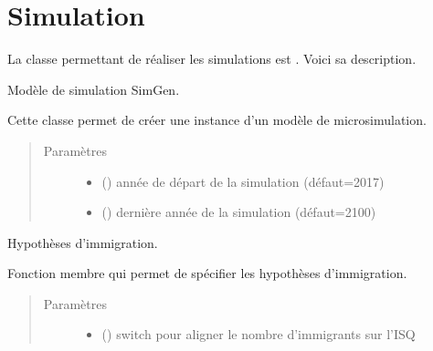 \documentclass[letterpaper,10pt,french]{sphinxmanual}
\begin{document}
\section{Simulation}
\label{\detokenize{code:simulation}}
La classe permettant de réaliser les simulations est . Voici sa description.

\begin{fulllineitems}
\label{\detokenize{code:simgen.model}}
Modèle de simulation SimGen.

Cette classe permet de créer une instance d’un modèle de microsimulation.
\begin{quote}\begin{description}
\item[{Paramètres}] \leavevmode\begin{itemize}
\item {} 
 () \textendash{} année de départ de la simulation (défaut=2017)

\item {} 
 () \textendash{} dernière année de la simulation (défaut=2100)

\end{itemize}

\end{description}\end{quote}

\begin{fulllineitems}
\label{\detokenize{code:simgen.model.immig_assumptions}}
Hypothèses d’immigration.

Fonction membre qui permet de spécifier les hypothèses d’immigration.
\begin{quote}\begin{description}
\item[{Paramètres}] \leavevmode\begin{itemize}
\item {} 
 () \textendash{} switch pour aligner le nombre d’immigrants sur l’ISQ


\end{itemize}
\end{description}
\end{quote}
\end{fulllineitems}
\end{fulllineitems}
\end{document}
